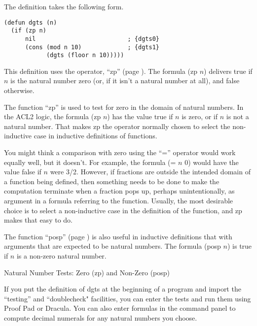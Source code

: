 The definition takes the following form.
\label{dgts-defun}
\begin{Verbatim}
(defun dgts (n)
  (if (zp n)
      nil                          ; {dgts0}
      (cons (mod n 10)             ; {dgts1}
            (dgts (floor n 10)))))
\end{Verbatim}

This definition uses the operator, ``zp'' (page \pageref{zp-def}).
The formula (zp $n$) delivers true if $n$ is the natural number zero
(or, if it isn't a natural number at all), and false otherwise.

\begin{aside}
The function ``zp'' is used to test for zero
in the domain of natural numbers.
In the ACL2 logic, the formula (zp $n$) has the value true if $n$ is zero,
or if $n$ is not a natural number.
That makes zp the operator normally chosen to select
the non-inductive case in inductive definitions of functions.

You might think a comparison with zero using the ``='' operator
would work equally well, but it doesn't.
For example, the formula (= $n$ 0) would have the
value false if $n$ were 3/2.
However, if fractions are outside the
intended domain of a function being defined,
then something needs to be done to make the
computation terminate when a fraction pops up,
perhaps unintentionally, as argument in a formula referring to the function.
Usually, the most desirable choice is to select
a non-inductive case in the definition of the function,
and zp makes that easy to do.

The function ``posp'' (page \pageref{posp-def})
is also useful in inductive definitions
that with arguments that are expected to be natural numbers.
The formula (posp $n$) is true if $n$ is a non-zero natural number.
\caption{Natural Number Tests: Zero (zp) and Non-Zero (posp)}
\label{zp-def}
\end{aside}

If you put the definition of dgts at the beginning of a program
and import the ``testing'' and ``doublecheck" facilities, you
can enter the tests and run them using Proof Pad or Dracula.
You can also enter formulas in the command panel to compute
decimal numerals for any natural numbers you choose.


